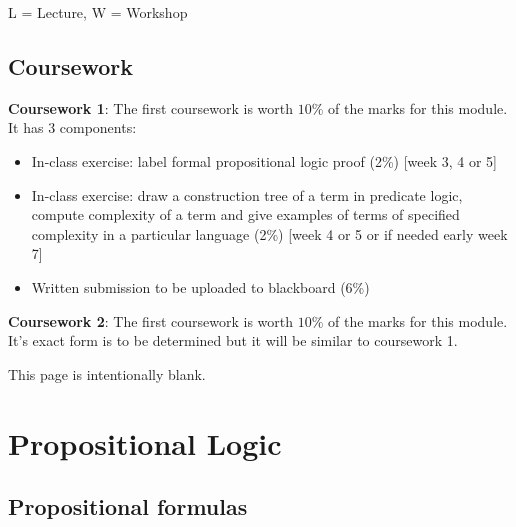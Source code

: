 \documentclass[11pt]{article}
\newcommand{\N}{\mathbb{N}}
\begin{document}
\medskip
\noindent
L = Lecture, W = Workshop%

\bigskip

\subsection*{Coursework}

\noindent
\textbf{Coursework 1}: The first coursework is worth $10\%$ of the marks for this module. It has $3$ components:

\begin{itemize}
\item   In-class exercise: label formal propositional logic proof (2\%) [week 3, 4 or 5]
\item   In-class exercise: draw a construction tree of a term in predicate logic, compute complexity of a term and give examples of terms of specified complexity in a particular language (2\%) [week 4 or 5 or if needed early week 7]
\item   Written submission to be uploaded to blackboard (6\%)
\end{itemize}

\noindent
\textbf{Coursework 2}: The first coursework is worth $10\%$ of the marks for this module. It's exact form is to be determined but it will be similar to coursework 1. 




\newpage

\begin{center}
This page is intentionally blank.
\end{center}

\newpage

\section{Propositional Logic}

\subsection{Propositional formulas}\label{propflas}
%
%
%
%
\end{document}
